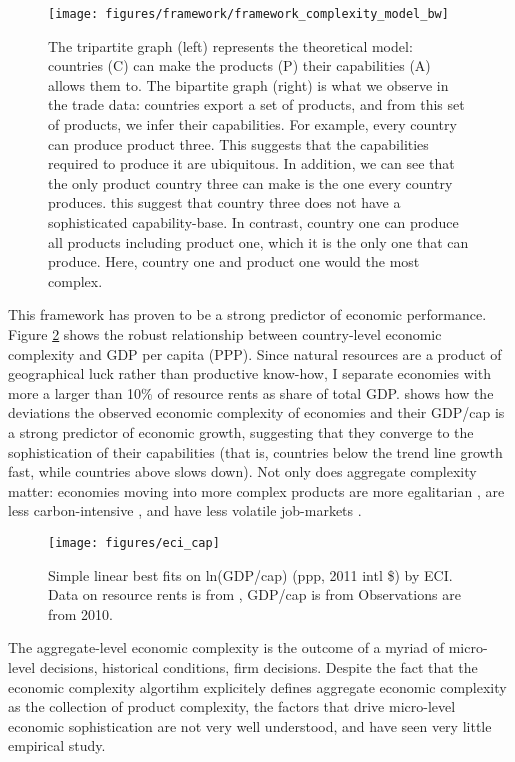 \documentclass[11pt]{article}
\begin{document}
\begin{figure}[htpb]
  \centering
  \texttt{[image: figures/framework/framework\_complexity\_model\_bw]}
	\caption{The tripartite graph (left) represents the theoretical model: countries (C) can make the products (P) their capabilities (A) allows them to. The bipartite graph (right) is what we observe in the trade data: countries export a set of products, and from this set of products, we infer their capabilities. For example, every country can produce product three. This suggests that the capabilities required to produce it are ubiquitous. In addition, we can see that the only product country three can make is the one every country produces. this suggest that country three does not have a sophisticated capability-base. In contrast, country one can produce all products including product one, which it is the only one that can produce. Here, country one and product one would the most complex.}
	\label{fig:complexity-model}
\end{figure}

This framework has proven to be a strong predictor of economic performance. Figure \ref{fig:framework-eci-gdp} shows the robust relationship between country-level economic complexity and GDP per capita (PPP). Since natural resources are a product of geographical luck rather than productive know-how, I separate economies with more a larger than 10\% of resource rents as share of total GDP. \cite{hausmann_atlas_2013} shows how the deviations the observed economic complexity of economies and their GDP/cap is a strong predictor of economic growth, suggesting that they converge to the sophistication of their capabilities (that is, countries below the trend line growth fast, while countries above slows down). Not only does aggregate complexity matter: economies moving into more complex products are more egalitarian \citep{hartmann_linking_2017-1}, are less carbon-intensive \citep{can_impact_2017}, and have less volatile job-markets \citep{adam_economic_2019}.

\begin{figure}[htpb]
	\centering
	\texttt{[image: figures/eci\_cap]}
	\caption{Simple linear best fits on ln(GDP/cap) (ppp, 2011 intl \$) by ECI. Data on resource rents is from \cite{world_bank_world_2020}, GDP/cap is from \cite{world_bank_world_2020-1} Observations are from 2010.}
	\label{fig:framework-eci-gdp}
\end{figure}

The aggregate-level economic complexity is the outcome of a myriad of micro-level decisions, historical conditions, firm decisions. Despite the fact that the economic complexity algortihm explicitely defines aggregate economic complexity as the collection of product complexity, the factors that drive micro-level economic sophistication are not very well understood, and have seen very little empirical study.
\end{document}
